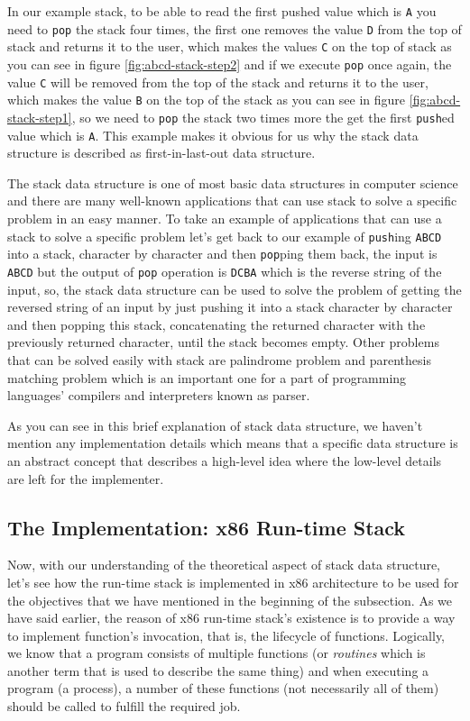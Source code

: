 In our example stack, to be able to read the first pushed value which is
\lstinline!A! you need to \lstinline!pop! the stack four times, the
first one removes the value \lstinline!D! from the top of stack and
returns it to the user, which makes the values \lstinline!C! on the top
of stack as you can see in figure \ref{fig:abcd-stack-step2} and if we
execute \lstinline!pop! once again, the value \lstinline!C! will be
removed from the top of the stack and returns it to the user, which
makes the value \lstinline!B! on the top of the stack as you can see in
figure \ref{fig:abcd-stack-step1}, so we need to \lstinline!pop! the
stack two times more the get the first \lstinline!push!ed value which is
\lstinline!A!. This example makes it obvious for us why the stack data
structure is described as first-in-last-out data structure.

The stack data structure is one of most basic data structures in
computer science and there are many well-known applications that can use
stack to solve a specific problem in an easy manner. To take an example
of applications that can use a stack to solve a specific problem let's
get back to our example of \lstinline!push!ing \lstinline!ABCD! into a
stack, character by character and then \lstinline!pop!ping them back,
the input is \lstinline!ABCD! but the output of \lstinline!pop!
operation is \lstinline!DCBA! which is the reverse string of the input,
so, the stack data structure can be used to solve the problem of getting
the reversed string of an input by just pushing it into a stack
character by character and then popping this stack, concatenating the
returned character with the previously returned character, until the
stack becomes empty. Other problems that can be solved easily with stack
are palindrome problem and parenthesis matching problem which is an
important one for a part of programming languages' compilers and
interpreters known as parser.

As you can see in this brief explanation of stack data structure, we
haven't mention any implementation details which means that a specific
data structure is an abstract concept that describes a high-level idea
where the low-level details are left for the implementer.

\subsection{The Implementation: x86 Run-time
Stack}\label{the-implementation-x86-run-time-stack}

Now, with our understanding of the theoretical aspect of stack data
structure, let's see how the run-time stack is implemented in x86
architecture to be used for the objectives that we have mentioned in the
beginning of the subsection. As we have said earlier, the reason of x86
run-time stack's existence is to provide a way to implement function's
invocation, that is, the lifecycle of functions. Logically, we know that
a program consists of multiple functions (or \emph{routines} which is
another term that is used to describe the same thing) and when executing
a program (a process), a number of these functions (not necessarily all
of them) should be called to fulfill the required job.

